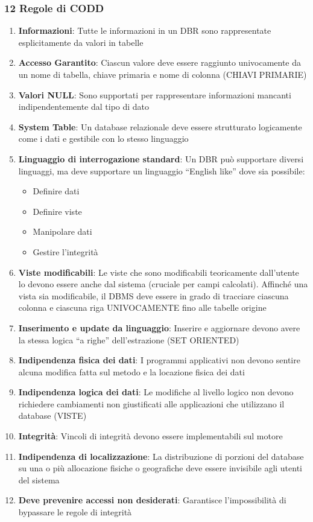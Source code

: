 \documentclass[12pt,a4paper]{article}
\begin{document}
\subsubsection{12 Regole di CODD}
\begin{enumerate}
\item \textbf{Informazioni}: Tutte le informazioni in un DBR sono rappresentate esplicitamente da valori in tabelle
\item \textbf{Accesso Garantito}: Ciascun valore deve essere raggiunto univocamente da un nome di tabella, chiave primaria e nome di colonna (CHIAVI PRIMARIE)
\item \textbf{Valori NULL}: Sono supportati per rappresentare informazioni mancanti indipendentemente dal tipo di dato
\item \textbf{System Table}: Un database relazionale deve essere strutturato logicamente come i dati e gestibile con lo stesso linguaggio
\item \textbf{Linguaggio di interrogazione standard}: Un DBR può supportare diversi linguaggi, ma deve supportare un linguaggio “English like” dove sia possibile:
\begin{itemize}
\item Definire dati
\item Definire viste
\item Manipolare dati
\item Gestire l'integrità
\end{itemize}
\item \textbf{Viste modificabili}: Le viste che sono modificabili teoricamente dall’utente lo devono essere anche dal sistema (cruciale per campi calcolati). Affinché una vista sia modificabile, il DBMS deve essere in grado di tracciare ciascuna colonna e ciascuna riga UNIVOCAMENTE fino alle tabelle origine
\item \textbf{Inserimento e update da linguaggio}: Inserire e aggiornare devono avere la stessa logica “a righe” dell’estrazione (SET ORIENTED)
\item \textbf{Indipendenza fisica dei dati}: I programmi applicativi non devono sentire alcuna modifica fatta sul metodo e la locazione fisica dei dati
\item \textbf{Indipendenza logica dei dati}: Le modifiche al livello logico non devono richiedere cambiamenti non giustificati alle applicazioni che utilizzano il database (VISTE)
\item \textbf{Integrità}: Vincoli di integrità devono essere implementabili sul motore
\item \textbf{Indipendenza di localizzazione}: La distribuzione di porzioni del database su una o più allocazione fisiche o geografiche deve essere invisibile agli utenti del sistema
\item \textbf{Deve prevenire accessi non desiderati}: Garantisce l’impossibilità di bypassare le regole di integrità
\end{enumerate}
\end{document}

